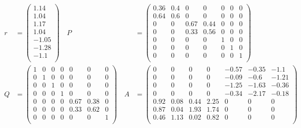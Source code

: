\begin{equation*}
  \begin{aligned}
  r &= \begin{pmatrix}
  1.14\\
  1.04\\
  1.17\\
  1.04\\
  -1.05\\
  -1.28\\
  -1.1\\
  \end{pmatrix} \quad
  P &= \begin{pmatrix}
  0.36 & 0.4 & 0 & 0 & 0 & 0 & 0 \\
  0.64 & 0.6 & 0 & 0 & 0 & 0 & 0 \\
  0 & 0 & 0.67 & 0.44 & 0 & 0 & 0 \\
  0 & 0 & 0.33 & 0.56 & 0 & 0 & 0 \\
  0 & 0 & 0 & 0 & 1 & 0 & 0 \\
  0 & 0 & 0 & 0 & 0 & 1 & 0 \\
  0 & 0 & 0 & 0 & 0 & 0 & 1 \\
  \end{pmatrix} \quad \\
  Q &= \begin{pmatrix}
  1 & 0 & 0 & 0 & 0 & 0 & 0 \\
  0 & 1 & 0 & 0 & 0 & 0 & 0 \\
  0 & 0 & 1 & 0 & 0 & 0 & 0 \\
  0 & 0 & 0 & 1 & 0 & 0 & 0 \\
  0 & 0 & 0 & 0 & 0.67 & 0.38 & 0 \\
  0 & 0 & 0 & 0 & 0.33 & 0.62 & 0 \\
  0 & 0 & 0 & 0 & 0 & 0 & 1 \\
  \end{pmatrix} \quad
  A &= \begin{pmatrix}
  0 & 0 & 0 & 0 & -0.57 & -0.35 & -1.1 \\
  0 & 0 & 0 & 0 & -0.09 & -0.6 & -1.21 \\
  0 & 0 & 0 & 0 & -1.25 & -1.63 & -0.36 \\
  0 & 0 & 0 & 0 & -0.34 & -2.17 & -0.18 \\
  0.92 & 0.08 & 0.44 & 2.25 & 0 & 0 & 0 \\
  0.87 & 0.04 & 1.93 & 1.74 & 0 & 0 & 0 \\
  0.46 & 1.13 & 0.02 & 0.82 & 0 & 0 & 0 \\
  \end{pmatrix}
  \end{aligned}
  \end{equation*}
